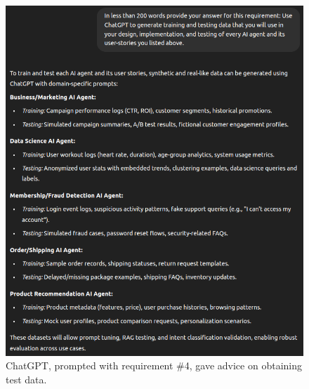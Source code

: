 \documentclass[11pt,letterpaper]{article}
\begin{document}
\clearpage

\begin{figure}[h!]
    \centering
      \includegraphics[width=1.0\linewidth]{chatgpt_05.png}    
      \caption{ChatGPT, prompted with requirement \#4, gave advice on obtaining test data.}
    \label{fig:req4}
\end{figure}

\clearpage
\end{document}
